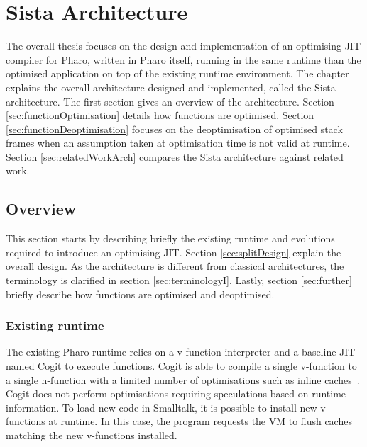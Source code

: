 \documentclass[a4paper,12pt,twoside]{../includes/ThesisStyle}
\begin{document}
\fi

\chapter{Sista Architecture}
\label{chap:architecture}
\minitoc

The overall thesis focuses on the design and implementation of an optimising JIT compiler for Pharo, written in Pharo itself, running in the same runtime than the optimised application on top of the existing runtime environment. The chapter explains the overall architecture designed and implemented, called the Sista architecture. The first section gives an overview of the architecture. Section \ref{sec:functionOptimisation} details how functions are optimised. Section \ref{sec:functionDeoptimisation} focuses on the deoptimisation of optimised stack frames when an assumption taken at optimisation time is not valid at runtime. Section \ref{sec:relatedWorkArch} compares the Sista architecture against related work.


\section{Overview}

This section starts by describing briefly the existing runtime and evolutions required to introduce an optimising JIT. Section \ref{sec:splitDesign} explain the overall design. As the architecture is different from classical architectures, the terminology is clarified in section \ref{sec:terminologyI}. Lastly, section \ref{sec:further} briefly describe how functions are optimised and deoptimised. 

\subsection{Existing runtime}

The existing Pharo runtime relies on a v-function interpreter and a baseline JIT named Cogit to execute functions. Cogit is able to compile a single v-function to a single n-function with a limited number of optimisations such as inline caches~\cite{Deut84a,Holz91a}. Cogit does not perform optimisations requiring speculations based on runtime information. To load new code in Smalltalk, it is possible to install new v-functions at runtime. In this case, the program requests the VM to flush caches matching the new v-functions installed.
\end{document}

